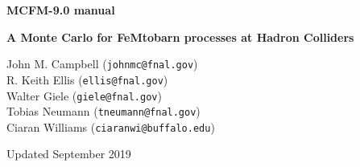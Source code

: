 \documentclass[letterpaper,parskip=half]{scrartcl}
\begin{document}
\begin{titlepage}
	\centering
	{\huge\bfseries MCFM-9.0 manual\par\vspace{0.3em}}
	{\large\bfseries A Monte Carlo for FeMtobarn processes at Hadron Colliders}
	
	John M. Campbell ({\tt johnmc@fnal.gov}) \\
	R. Keith Ellis ({\tt ellis@fnal.gov}) \\
	Walter Giele ({\tt giele@fnal.gov}) \\
	Tobias Neumann ({\tt tneumann@fnal.gov}) \\
	Ciaran Williams ({\tt ciaranwi@buffalo.edu}) \\	
	
	{\par\vspace{1em} Updated September 2019}
	
	\tableofcontents
\end{titlepage}









%





\appendix







\printbibliography
\end{document}
